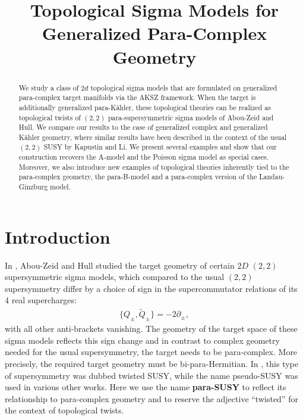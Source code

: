 \documentclass{article}
\title{Topological Sigma Models for Generalized Para-Complex Geometry}
\newcommand{\p}{\partial}
\def\tl{\tilde}
\theoremstyle{definition}
\theoremstyle{remark}
\begin{document}
\maketitle
\begin{abstract}
We study a class of $2d$ topological sigma models that are formulated on generalized para-complex target manifolds via the AKSZ framework. When the target is additionally generalized para-K\"ahler, these topological theories can be realized as topological twists of $(2,2)$ para-supersymmetric sigma models of Abou-Zeid and Hull. We compare our results to the case of generalized complex and generalized K\"ahler geometry, where similar results have been described in the context of the usual $(2,2)$ SUSY by Kapustin and Li. We present several examples and show that our construction recovers the A-model and the Poisson sigma model as special cases. Moreover, we also introduce new examples of topological theories inherently tied to the para-complex geometry, the para-B-model and a para-complex version of the Landau-Ginzburg model.


\end{abstract}
\newpage
\tableofcontents
\newpage
\section{Introduction}

In \cite{HullTwistedSUSY}, Abou-Zeid and Hull studied the target geometry of certain $2D$ $(2,2)$ supersymmetric sigma models, which compared to the usual $(2,2)$ supersymmetry differ by a choice of sign in the supercommutator relations of its $4$ real supercharges:
\begin{align*}
\{Q_\pm,\tl{Q}_\pm\}=-2\p_\pm,
\end{align*}
with all other anti-brackets vanishing. The geometry of the target space of these sigma models reflects this sign change and in contrast to complex geometry needed for the usual supersymmetry, the target needs to be para-complex. More precisely, the required target geometry must be bi-para-Hermitian. In \cite{HullTwistedSUSY}, this type of supersymmetry was dubbed {twisted} SUSY, while the name {pseudo}-SUSY was used in various other works. Here we use the name {\bf para-SUSY} to reflect its relationship to para-complex geometry and to reserve the adjective ``twisted'' for the context of topological twists.
\end{document}
